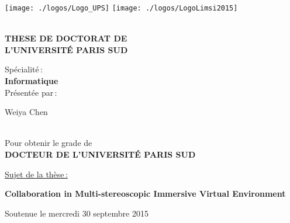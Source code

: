 \begin{titlepage}

\texttt{[image: ./logos/Logo\_UPS]}\hfill
\texttt{[image: ./logos/LogoLimsi2015]}\hfill
\\
\\

\begin{center}
  \begin{Large}
    \textbf{THESE DE DOCTORAT DE\\ L'UNIVERSIT\'E PARIS SUD\\}
  \end{Large}
  Sp\'ecialit\'e\,:\\
  \textbf{Informatique}\\ 
  Pr\'esent\'ee par\,:\\ 
  \begin{LARGE}
    Weiya Chen\end{LARGE}\\
  Pour obtenir le grade de\\
  \textbf{DOCTEUR DE L'UNIVERSIT\'E PARIS SUD}
\end{center}

\noindent \underline{Sujet de la thèse\,:}\\
\begin{center}
  \begin{Large}
    {\textbf{Collaboration in Multi-stereoscopic Immersive Virtual Environment}}
  \end{Large}
\end{center}

Soutenue le mercredi 30 septembre 2015\\


\end{titlepage}
